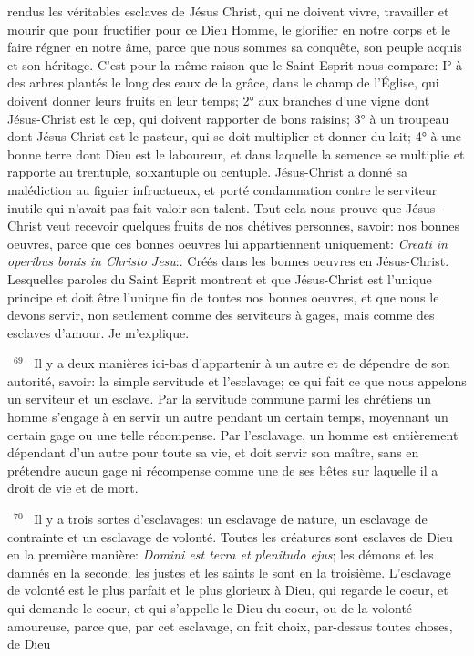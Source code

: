 \documentclass[paper=a5,pagesize=pdftex,fontsize=15pt,headinclude=on,twoside=off]{scrbook}
\newcommand{\negphantom}[1]{\settowidth{\dimen0}{#1}\hspace*{-\dimen0}}
\newcommand{\versenb}[1]{\par \vspace{10pt}~\negphantom{~${}^{#1}$~}${}^{#1}$~}
\newcommand{\latin}[1]{\emph{#1}}
\begin{document}
rendus les véritables esclaves de Jésus Christ, qui ne doivent vivre, travailler et mourir que pour fructifier pour ce
Dieu Homme, le glorifier en notre corps et le faire régner en notre âme, parce que nous sommes sa conquête, son
peuple acquis et son héritage. C'est pour la même raison que le Saint-Esprit nous compare: I° à des arbres plantés
le long des eaux de la grâce, dans le champ de l'Église, qui doivent donner leurs fruits en leur temps; 2° aux
branches d'une vigne dont Jésus-Christ est le cep, qui doivent rapporter de bons raisins; 3° à un troupeau dont
Jésus-Christ est le pasteur, qui se doit multiplier et donner du lait; 4° à une bonne terre dont Dieu est le laboureur,
et dans laquelle la semence se multiplie et rapporte au trentuple, soixantuple ou centuple. Jésus-Christ a donné sa
malédiction au figuier infructueux, et porté condamnation contre le serviteur inutile qui n'avait pas fait valoir son
talent. Tout cela nous prouve que Jésus-Christ veut recevoir quelques fruits de nos chétives personnes, savoir:
nos bonnes oeuvres, parce que ces bonnes oeuvres lui appartiennent uniquement: \latin{Creati in operibus bonis in
Christo Jesu}:. Créés dans les bonnes oeuvres en Jésus-Christ. Lesquelles paroles du Saint Esprit montrent et que
Jésus-Christ est l'unique principe et doit être l'unique fin de toutes nos bonnes oeuvres, et que nous le devons
servir, non seulement comme des serviteurs à gages, mais comme des esclaves d'amour. Je m'explique.
\versenb{69} Il y a deux manières ici-bas d'appartenir à un autre et de dépendre de son autorité, savoir: la simple servitude
et l'esclavage; ce qui fait ce que nous appelons un serviteur et un esclave.
Par la servitude commune parmi les chrétiens un homme s'engage à en servir un autre pendant un certain temps,
moyennant un certain gage ou une telle récompense.
Par l'esclavage, un homme est entièrement dépendant d'un autre pour toute sa vie, et doit servir son maître, sans
en prétendre aucun gage ni récompense comme une de ses bêtes sur laquelle il a droit de vie et de mort.
\versenb{70} Il y a trois sortes d'esclavages: un esclavage de nature, un esclavage de contrainte et un esclavage de
volonté. Toutes les créatures sont esclaves de Dieu en la première manière: \latin{Domini est terra et plenitudo ejus}; les
démons et les damnés en la seconde; les justes et les saints le sont en la troisième. L'esclavage de volonté est le
plus parfait et le plus glorieux à Dieu, qui regarde le coeur, et qui demande le coeur, et qui s'appelle le Dieu du
coeur, ou de la volonté amoureuse, parce que, par cet esclavage, on fait choix, par-dessus toutes choses, de Dieu
\end{document}
